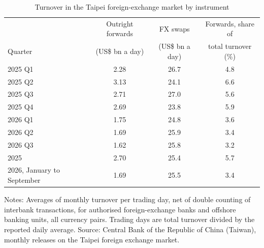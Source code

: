 \begin{table}[htbp]
\centering
\small
\begin{threeparttable}
\caption{Turnover in the Taipei foreign-exchange market by instrument}\label{tab:turnover}
\begin{tabular}{@{}lccc@{}}
\toprule
& Outright forwards & FX swaps & Forwards, share of \\
Quarter & (US\$ bn a day) & (US\$ bn a day) & total turnover (\%) \\
\midrule
2025 Q1 & 2.28 & 26.7 & 4.8 \\
2025 Q2 & 3.13 & 24.1 & 6.6 \\
2025 Q3 & 2.71 & 27.0 & 5.6 \\
2025 Q4 & 2.69 & 23.8 & 5.9 \\
2026 Q1 & 1.75 & 24.8 & 3.6 \\
2026 Q2 & 1.69 & 25.9 & 3.4 \\
2026 Q3 & 1.62 & 25.8 & 3.2 \\
\midrule
2025 & 2.70 & 25.4 & 5.7 \\
2026, January to September & 1.69 & 25.5 & 3.4 \\
\bottomrule
\end{tabular}
\begin{tablenotes}
\footnotesize
\item Notes: Averages of monthly turnover per trading day, net of double counting of interbank transactions, for authorised foreign-exchange banks and offshore banking units, all currency pairs. Trading days are total turnover divided by the reported daily average. Source: Central Bank of the Republic of China (Taiwan), monthly releases on the Taipei foreign exchange market.
\end{tablenotes}
\end{threeparttable}
\end{table}
